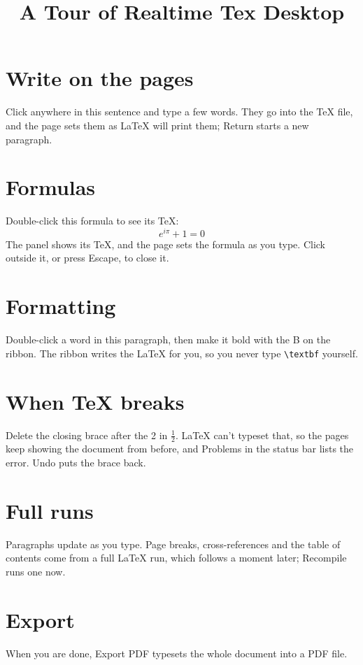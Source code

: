 \documentclass[11pt]{article}
\title{A Tour of Realtime Tex Desktop}
\author{}
\date{}
\begin{document}
\maketitle

\section{Write on the pages}

Click anywhere in this sentence and type a few words. They go into the TeX file, and the page sets them as LaTeX will print them; Return starts a new paragraph.

\section{Formulas}

Double-click this formula to see its TeX:
\[ e^{i\pi} + 1 = 0 \]
The panel shows its TeX, and the page sets the formula as you type. Click outside it, or press Escape, to close it.

\section{Formatting}

Double-click a word in this paragraph, then make it bold with the B on the ribbon. The ribbon writes the LaTeX for you, so you never type \texttt{\textbackslash textbf} yourself.



\section{When TeX breaks}

Delete the closing brace after the 2 in $\frac{1}{2}$. LaTeX can't typeset that, so the pages keep showing the document from before, and Problems in the status bar lists the error. Undo puts the brace back.

\section{Full runs}

Paragraphs update as you type. Page breaks, cross-references and the table of contents come from a full LaTeX run, which follows a moment later; Recompile runs one now.

\section{Export}

When you are done, Export PDF typesets the whole document into a PDF file.
\end{document}

